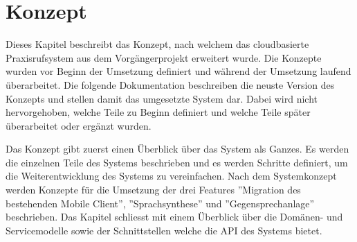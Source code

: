 \section{Konzept}

Dieses Kapitel beschreibt das Konzept, nach welchem das cloudbasierte Praxisrufsystem aus dem Vorgängerprojekt erweitert wurde.
Die Konzepte wurden vor Beginn der Umsetzung definiert und während der Umsetzung laufend überarbeitet.
Die folgende Dokumentation beschreiben die neuste Version des Konzepts und stellen damit das umgesetzte System dar.
Dabei wird nicht hervorgehoben, welche Teile zu Beginn definiert und welche Teile später überarbeitet oder ergänzt wurden.

Das Konzept gibt zuerst einen Überblick über das System als Ganzes.
Es werden die einzelnen Teile des Systems beschrieben und es werden Schritte definiert, um die Weiterentwicklung des Systems zu vereinfachen.
Nach dem Systemkonzept werden Konzepte für die Umsetzung der drei Features ''Migration des bestehenden Mobile Client'', ''Sprachsynthese'' und ''Gegensprechanlage'' beschrieben.
Das Kapitel schliesst mit einem Überblick über die Domänen- und Servicemodelle sowie der Schnittstellen welche die API des Systems bietet.





